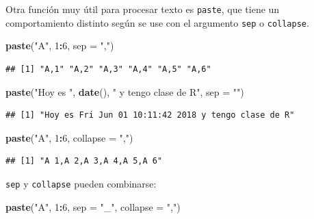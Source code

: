 \documentclass[]{article}
\newenvironment{Shaded}{\begin{snugshade}}{\end{snugshade}}
\newcommand{\KeywordTok}[1]{\textcolor[rgb]{0.13,0.29,0.53}{\textbf{#1}}}
\newcommand{\DataTypeTok}[1]{\textcolor[rgb]{0.13,0.29,0.53}{#1}}
\newcommand{\DecValTok}[1]{\textcolor[rgb]{0.00,0.00,0.81}{#1}}
\newcommand{\StringTok}[1]{\textcolor[rgb]{0.31,0.60,0.02}{#1}}
\newcommand{\OperatorTok}[1]{\textcolor[rgb]{0.81,0.36,0.00}{\textbf{#1}}}
\newcommand{\NormalTok}[1]{#1}
\begin{document}
Otra función muy útil para procesar texto es \texttt{paste}, que tiene
un comportamiento distinto según se use con el argumento \texttt{sep} o
\texttt{collapse}.

\begin{Shaded}
\begin{Highlighting}[]
\KeywordTok{paste}\NormalTok{(}\StringTok{"A"}\NormalTok{, }\DecValTok{1}\OperatorTok{:}\DecValTok{6}\NormalTok{, }\DataTypeTok{sep =} \StringTok{","}\NormalTok{)}
\end{Highlighting}
\end{Shaded}

\begin{verbatim}
## [1] "A,1" "A,2" "A,3" "A,4" "A,5" "A,6"
\end{verbatim}

\begin{Shaded}
\begin{Highlighting}[]
\KeywordTok{paste}\NormalTok{(}\StringTok{"Hoy es "}\NormalTok{, }\KeywordTok{date}\NormalTok{(), }\StringTok{" y tengo clase de R"}\NormalTok{, }\DataTypeTok{sep =} \StringTok{""}\NormalTok{)}
\end{Highlighting}
\end{Shaded}

\begin{verbatim}
## [1] "Hoy es Fri Jun 01 10:11:42 2018 y tengo clase de R"
\end{verbatim}

\begin{Shaded}
\begin{Highlighting}[]
\KeywordTok{paste}\NormalTok{(}\StringTok{"A"}\NormalTok{, }\DecValTok{1}\OperatorTok{:}\DecValTok{6}\NormalTok{, }\DataTypeTok{collapse =} \StringTok{","}\NormalTok{)}
\end{Highlighting}
\end{Shaded}

\begin{verbatim}
## [1] "A 1,A 2,A 3,A 4,A 5,A 6"
\end{verbatim}

\texttt{sep} y \texttt{collapse} pueden combinarse:

\begin{Shaded}
\begin{Highlighting}[]
\KeywordTok{paste}\NormalTok{(}\StringTok{"A"}\NormalTok{, }\DecValTok{1}\OperatorTok{:}\DecValTok{6}\NormalTok{, }\DataTypeTok{sep =} \StringTok{"_"}\NormalTok{, }\DataTypeTok{collapse =} \StringTok{","}\NormalTok{)}
\end{Highlighting}
\end{Shaded}
\end{document}
